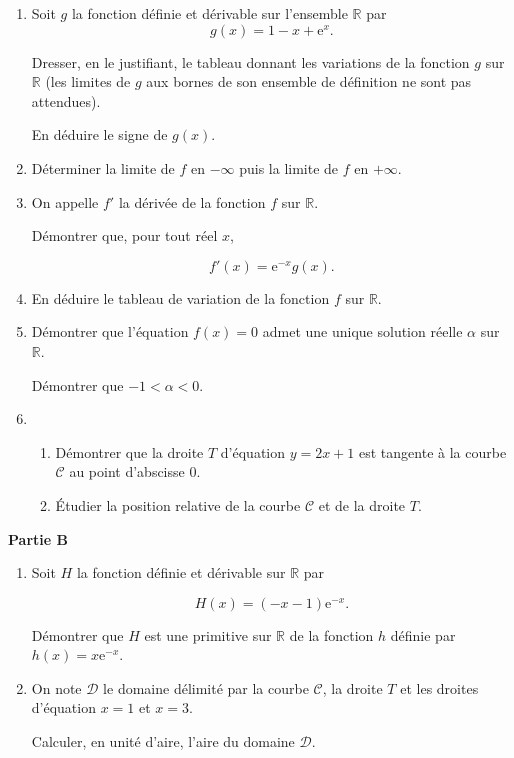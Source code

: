 \documentclass[10pt]{article}
\newcommand{\R}{\mathbb{R}}
\begin{document}
\begin{enumerate}
\item Soit $g$ la fonction définie et dérivable sur l'ensemble $\R$ par 
\[g(x) = 1 - x + \text{e}^x.\]
 
Dresser, en le justifiant, le tableau donnant les variations de la fonction $g$ sur $\R$ (les limites de $g$ aux bornes de son ensemble de définition ne sont pas attendues).
 
En déduire le signe de $g(x)$. 
\item Déterminer la limite de $f$ en $- \infty$ puis la limite de $f$ en $+ \infty$. 
\item On appelle $f'$ la dérivée de la fonction $f$ sur $\R$. 

Démontrer que, pour tout réel $x$, 

\[f'(x) = \text{e}^{- x}g(x).\]
 
\item En déduire le tableau de variation de la fonction $f$ sur $\R$. 
\item Démontrer que l'équation $f(x) = 0$ admet une unique solution réelle $\alpha$ sur $\R$.
 
Démontrer que $- 1 < \alpha < 0$.  
\item 
	\begin{enumerate}
		\item Démontrer que la droite $T$ d'équation $y = 2x + 1$ est tangente à la courbe $\mathcal{C}$  au point d'abscisse $0$.
		\item Étudier la position relative de la courbe $\mathcal{C}$ et de la droite $T$.
	\end{enumerate} 
\end{enumerate}

\bigskip

\textbf{Partie B}

\medskip
 
\begin{enumerate}
\item Soit $H$ la fonction définie et dérivable sur $\R$ par 

\[H(x) = (- x - 1)\text{e}^{- x}.\]
 
Démontrer que $H$ est une primitive sur $\R$ de la fonction $h$ définie par $h(x) = x\text{e}^{- x}$. 
\item On note $\mathcal{D}$ le domaine délimité par la courbe $\mathcal{C}$, la droite $T$ et les droites d'équation $x = 1$ et $x = 3$.
 
Calculer, en unité d'aire, l'aire du domaine $\mathcal{D}$. 
\end{enumerate}
\end{document}

